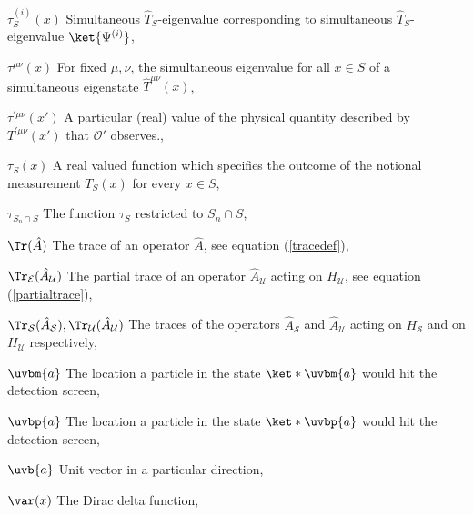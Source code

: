 \begin{thenomenclature}
      \item [{$\tau^{(i)}_S(x)$}]\begingroup Simultaneous $\hat{T}_S$-eigenvalue corresponding to simultaneous $\hat{T}_S$-eigenvalue $\ket{\Psi^{(i)}}$, \nomrefpage{}
      \item [{$\tau^{\mu\nu}(x)$}]\begingroup For fixed $\mu,\nu$, the simultaneous eigenvalue for all $x\in S$ of a simultaneous eigenstate $\hat{T}^{\mu\nu}(x)$, \nomrefpage{}
      \item [{$\tau^{\prime\mu\nu}(x')$}]\begingroup A particular (real) value of the physical quantity described by $T^{\prime\mu\nu}(x')$ that $\mathcal{O}'$ observes., \nomrefpage{}
      \item [{$\tau_S(x)$}]\begingroup A real valued function which specifies the outcome of the notional measurement $T_S(x)$ for every $x\in S$, \nomrefpage{}
      \item [{$\tau_{S_n\cap S}$}]\begingroup The function $\tau_S$ restricted to $S_n\cap S$, \nomrefpage{}
      \item [{$\Tr (\hat{A})$}]\begingroup The trace of an operator $\hat{A}$, see equation (\ref{tracedef}), \nomrefpage{}
      \item [{$\Tr_\mathcal{E}(\hat{A}_\mathcal{U})$}]\begingroup The partial trace of an operator $\hat{A}_\mathcal{U}$ acting on $H_\mathcal{U}$,  see equation (\ref{partialtrace}), \nomrefpage{}
      \item [{$\Tr_\mathcal{S}(\hat{A}_\mathcal{S}), \Tr_\mathcal{U}(\hat{A}_\mathcal{U})$}]\begingroup The traces of the operators $\hat{A}_\mathcal{S}$ and $\hat{A}_\mathcal{U}$ acting  on $H_\mathcal{S}$ and on $H_\mathcal{U}$ respectively, \nomrefpage{}
      \item [{$\uvbm{a}$}]\begingroup The location a particle in the state $\ket*{\uvbm{a}}$ would hit the detection screen, \nomrefpage{}
      \item [{$\uvbp{a}$}]\begingroup The location a particle in the state $\ket*{\uvbp{a}}$ would hit the detection screen, \nomrefpage{}
      \item [{$\uvb{a}$}]\begingroup Unit vector in a particular direction, \nomrefpage{}
      \item [{$\var(x)$}]\begingroup The Dirac delta function, \nomrefpage{}

\end{thenomenclature}
